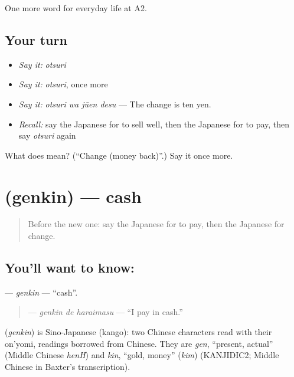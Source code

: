 \begin{grammarlens}[title={What you've built}]
One more word for everyday life at A2.
\end{grammarlens}

\subsection*{Your turn}
\begin{itemize}
\raggedright
  \item \emph{Say it:} \emph{otsuri}
  \item \emph{Say it:} \emph{otsuri}, once more
  \item \emph{Say it:} \emph{otsuri wa jūen desu} — The change is ten yen.
  \item \emph{Recall:} say the Japanese for to sell well, then the Japanese for to pay, then say \emph{otsuri} again
\end{itemize}

\begin{tcolorbox}[breakable,colback=teal!4,colframe=teal!35!black,title={Before you move on}]
What does  mean? (\textquotedblleft{}Change (money back)\textquotedblright{}.) Say it once more.
\end{tcolorbox}
\section[\texorpdfstring{\ja{げんきん} (genkin)}{げんきん (genkin)}]{ (genkin) — cash}

\label{lesson:JA-C182-genkin}



\begin{quote}
Before the new one: say the Japanese for to pay, then the Japanese for change.
\end{quote}

\subsection*{You'll want to know: }
\textbf{} — \emph{genkin} — \textquotedblleft{}cash\textquotedblright{}.

\begin{quote}
\textbf{ } — \emph{genkin de haraimasu} — \textquotedblleft{}I pay in cash.\textquotedblright{}
\end{quote}

\begin{cousinweb}
\textbf{} (\emph{genkin}) is Sino-Japanese (kango): two Chinese characters read with their on'yomi, readings borrowed from Chinese. They are \emph{gen}, \textquotedblleft{}present, actual\textquotedblright{} (Middle Chinese \emph{henH}) and \emph{kin}, \textquotedblleft{}gold, money\textquotedblright{} (\emph{kim}) (KANJIDIC2; Middle Chinese in Baxter's transcription).
\end{cousinweb}


